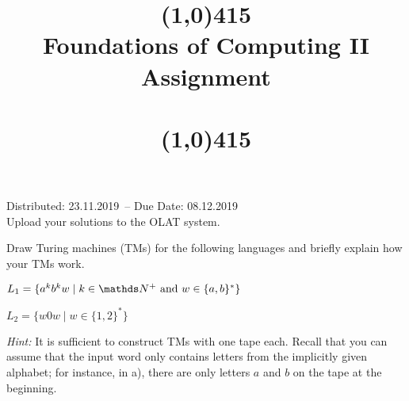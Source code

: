 \documentclass{exercise}
\title{\line(1,0){415}\\
  Foundations of Computing II\\
  \Large Assignment \theexercise\\[1em]
  \large{\topics}\\
  \line(1,0){415}}
\newcommand{\distdate}{23.11.2019}
\newcommand{\duedate}{08.12.2019}
\begin{document}
\maketitle

\begin{center}
  Distributed: \distdate\ -- Due Date: \duedate\\[1em]
  Upload your solutions to the OLAT system.\\[3em]
\end{center}


Draw Turing machines (TMs) for the following languages and briefly explain how
your TMs work.

\subtask $L_1 = \{ a^kb^kw \mid k\in\nat^+\text{ and } w\in\{a,b\}^* \}$


\subtask $L_2 = \{ w0w \mid w \in\{1,2\}^* \}$
  

\nosubtask \textit{Hint:} It is sufficient to construct TMs with one tape each.
Recall that you can assume that the input word only contains letters from the
implicitly given alphabet; for instance, in a), there are only letters $a$ and
$b$ on the tape at the beginning.

\end{document}
